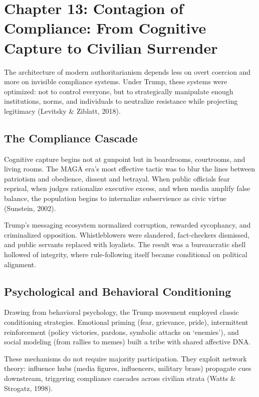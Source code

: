 \chapter{Chapter 13: Contagion of Compliance: From Cognitive Capture to Civilian Surrender}

The architecture of modern authoritarianism depends less on overt
coercion and more on invisible compliance systems. Under Trump, these
systems were optimized: not to control everyone, but to strategically
manipulate enough institutions, norms, and individuals to neutralize
resistance while projecting legitimacy (Levitsky \& Ziblatt, 2018).

\section*{The Compliance Cascade}

Cognitive capture begins not at gunpoint but in boardrooms, courtrooms,
and living rooms. The MAGA era's most effective tactic was to blur the
lines between patriotism and obedience, dissent and betrayal. When
public officials fear reprisal, when judges rationalize executive
excess, and when media amplify false balance, the population begins to
internalize subservience as civic virtue (Sunstein, 2002).

Trump's messaging ecosystem normalized corruption, rewarded sycophancy,
and criminalized opposition. Whistleblowers were slandered,
fact-checkers dismissed, and public servants replaced with loyalists.
The result was a bureaucratic shell hollowed of integrity, where
rule-following itself became conditional on political alignment.

\section*{Psychological and Behavioral Conditioning}

Drawing from behavioral psychology, the Trump movement employed classic
conditioning strategies. Emotional priming (fear, grievance, pride),
intermittent reinforcement (policy victories, pardons, symbolic attacks
on `enemies'), and social modeling (from rallies to memes) built a tribe
with shared affective DNA.

These mechanisms do not require majority participation. They exploit
network theory: influence hubs (media figures, influencers, military
brass) propagate cues downstream, triggering compliance cascades across
civilian strata (Watts \& Strogatz, 1998).

